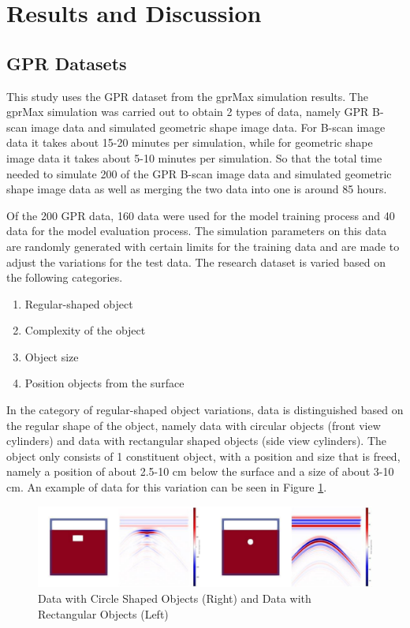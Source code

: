 \documentclass[conference]{IEEEtran}
\begin{document}
\section{Results and Discussion}

\subsection{GPR Datasets}
This study uses the GPR dataset from the gprMax simulation results. 
The gprMax simulation was carried out to obtain 2 types of data, namely GPR B-scan image data and simulated geometric shape image data. 
For B-scan image data it takes about 15-20 minutes per simulation, while for geometric shape image data it takes about 5-10 minutes per simulation. 
So that the total time needed to simulate 200 of the GPR B-scan image data and simulated geometric shape image data as well as merging the two data into one is around 85 hours.

Of the 200 GPR data, 160 data were used for the model training process and 40 data for the model evaluation process. 
The simulation parameters on this data are randomly generated with certain limits for the training data and are made to adjust the variations for the test data. 
The research dataset is varied based on the following categories.

\begin{enumerate}

  \item Regular-shaped object

  \item Complexity of the object

  \item Object size
  
  \item Position objects from the surface

\end{enumerate}

In the category of regular-shaped object variations, data is distinguished based on the regular shape of the object, namely data with circular objects (front view cylinders) and data with rectangular shaped objects (side view cylinders).
The object only consists of 1 constituent object, with a position and size that is freed, namely a position of about 2.5-10 cm below the surface and a size of about 3-10 cm.
An example of data for this variation can be seen in Figure \ref{fig:regularData}.

\begin{figure}[ht]
  \centering
  \includegraphics[scale=0.2]{gambar/variasi reguler.png}
  \caption{Data with Circle Shaped Objects (Right) and Data with Rectangular Objects (Left)}
  \label{fig:regularData}
\end{figure}
\end{document}
